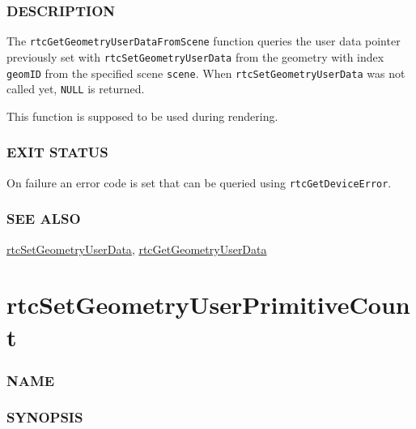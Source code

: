 \subsubsection{DESCRIPTION}\label{description}

The \texttt{rtcGetGeometryUserDataFromScene} function queries the user
data pointer previously set with \texttt{rtcSetGeometryUserData} from
the geometry with index \texttt{geomID} from the specified scene
\texttt{scene}. When \texttt{rtcSetGeometryUserData} was not called yet,
\texttt{NULL} is returned.

This function is supposed to be used during rendering.

\subsubsection{EXIT STATUS}\label{exit-status}

On failure an error code is set that can be queried using
\texttt{rtcGetDeviceError}.

\subsubsection{SEE ALSO}\label{see-also}

\hyperref[rtcsetgeometryuserdata]{rtcSetGeometryUserData},
\hyperref[rtcgetgeometryuserdata]{rtcGetGeometryUserData}

\pagebreak

\section{rtcSetGeometryUserPrimitiveCount}\label{rtcsetgeometryuserprimitivecount}

\subsubsection{NAME}\label{name}

\begin{Shaded}
\begin{Highlighting}[]
\OperatorTok{{-}}
\OperatorTok{{-}}
\end{Highlighting}
\end{Shaded}

\subsubsection{SYNOPSIS}\label{synopsis}

